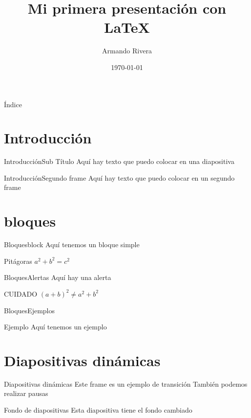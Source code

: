 \documentclass{beamer}
\author{Armando Rivera}
\date{\today}
\title{Mi primera presentación con \LaTeX}
\institute[UNAM]{Universidad Nacional Autónoma de México\\Facultad de Ingeniería}
\begin{document}
	\begin{frame}
		\maketitle
	\end{frame}
	\begin{frame}{Índice}
		\tableofcontents
	\end{frame}

\section{Introducción}
	\begin{frame}{Introducción}{Sub Título}
	Aquí hay texto que puedo colocar en una diapositiva
	\end{frame}
	\begin{frame}{Introducción}{Segundo frame}
	Aquí hay texto que puedo colocar en un segundo frame
	\end{frame}
\section{bloques}
	\begin{frame}{Bloques}{block}
		Aquí tenemos un bloque simple
		\begin{block}{Pitágoras}
			$  a^2 + b^2 = c^2 $
		\end{block}
	\end{frame}
\begin{frame}{Bloques}{Alertas}
Aquí hay una alerta
\begin{alertblock}{CUIDADO}
	$ (a+b)^2 \neq a^2 + b^2 $
\end{alertblock}
\end{frame}
\begin{frame}{Bloques}{Ejemplos}
	\begin{exampleblock}{Ejemplo}
		Aquí tenemos un ejemplo
	\end{exampleblock}
\end{frame}
\section{Diapositivas dinámicas}
\begin{frame}{Diapositivas dinámicas}
\transblindshorizontal
Este frame es un ejemplo de transición\pause
También podemos realizar pausas
\end{frame}

{
	
		\begin{frame}{Fondo de diapositivas}
			Esta diapositiva tiene el fondo cambiado
		\end{frame}	
}
\end{document}
